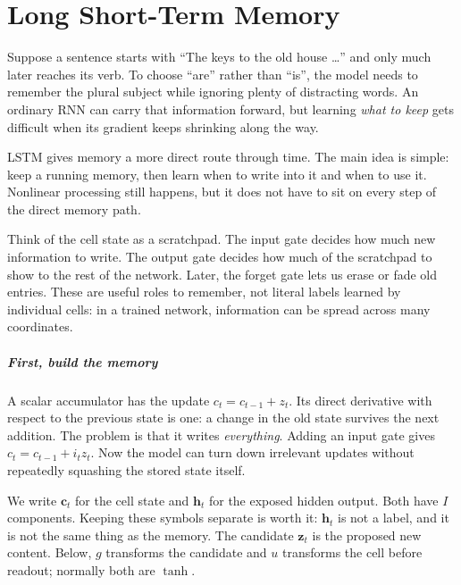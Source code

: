 \documentclass[11pt, oneside]{book}
\begin{document}
\chapter{Long Short-Term Memory}\label{ch:source-3}

Suppose a sentence starts with ``The keys to the old house \ldots'' and only much later reaches its verb. To choose ``are'' rather than ``is'', the model needs to remember the plural subject while ignoring plenty of distracting words. An ordinary RNN can carry that information forward, but learning \emph{what to keep} gets difficult when its gradient keeps shrinking along the way.

LSTM gives memory a more direct route through time. The main idea is simple: keep a running memory, then learn when to write into it and when to use it. Nonlinear processing still happens, but it does not have to sit on every step of the direct memory path.

\begin{intbox}[title={A scratchpad with controls}]
Think of the cell state as a scratchpad. The input gate decides how much new information to write. The output gate decides how much of the scratchpad to show to the rest of the network. Later, the forget gate lets us erase or fade old entries. These are useful roles to remember, not literal labels learned by individual cells: in a trained network, information can be spread across many coordinates.
\end{intbox}

\paragraph{First, build the memory} A scalar accumulator has the update $c_t=c_{t-1}+z_t$. Its direct derivative with respect to the previous state is one: a change in the old state survives the next addition. The problem is that it writes \emph{everything}. Adding an input gate gives $c_t=c_{t-1}+i_tz_t$. Now the model can turn down irrelevant updates without repeatedly squashing the stored state itself.

We write $\mathbf{c}_t$ for the cell state and $\mathbf{h}_t$ for the exposed hidden output. Both have $I$ components. Keeping these symbols separate is worth it: $\mathbf{h}_t$ is not a label, and it is not the same thing as the memory. The candidate $\mathbf{z}_t$ is the proposed new content. Below, $g$ transforms the candidate and $u$ transforms the cell before readout; normally both are $\tanh$.
\end{document}

